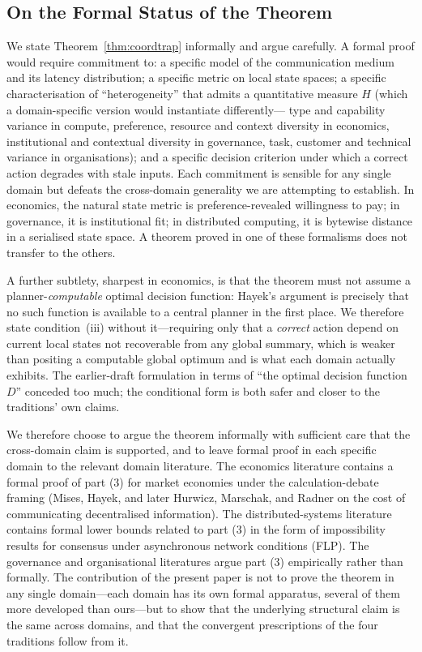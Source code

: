 \documentclass[11pt]{article}
\theoremstyle{definition}
\theoremstyle{plain}
\theoremstyle{plain}
\begin{document}
\subsection{On the Formal Status of the Theorem}
\label{sec:formalstatus}

We state Theorem~\ref{thm:coordtrap} informally and argue carefully. A formal
proof would require commitment to: a specific model of the communication
medium and its latency distribution; a specific metric on local state spaces;
a specific characterisation of ``heterogeneity'' that admits a quantitative
measure $H$ (which a domain-specific version would instantiate differently---
type and capability variance in compute, preference, resource and context
diversity in economics, institutional and contextual diversity in governance,
task, customer and technical variance in organisations); and a specific decision
criterion under which a correct action degrades with stale inputs. Each commitment is sensible for any
single domain but defeats the cross-domain generality we are attempting to
establish. In economics, the natural state metric is preference-revealed
willingness to pay; in governance, it is institutional fit; in distributed
computing, it is bytewise distance in a serialised state space. A theorem
proved in one of these formalisms does not transfer to the others.

A further subtlety, sharpest in economics, is that the theorem must not assume a
planner-\emph{computable} optimal decision function: Hayek's argument is precisely
that no such function is available to a central planner in the first place. We
therefore state condition~(iii) without it---requiring only that a \emph{correct}
action depend on current local states not recoverable from any global summary, which
is weaker than positing a computable global optimum and is what each domain actually
exhibits. The earlier-draft formulation in terms of ``the optimal decision function
$D$'' conceded too much; the conditional form is both safer and closer to the
traditions' own claims.

We therefore choose to argue the theorem informally with sufficient care that
the cross-domain claim is supported, and to leave formal proof in each
specific domain to the relevant domain literature. The economics literature
contains a formal proof of part (3) for market economies under the
calculation-debate framing (Mises, Hayek, and later Hurwicz, Marschak, and
Radner on the cost of communicating decentralised information). The
distributed-systems literature contains formal lower bounds related to
part (3) in the form of impossibility results for consensus under
asynchronous network conditions (FLP). The governance and organisational
literatures argue part (3) empirically rather than formally. The contribution
of the present paper is not to prove the theorem in any single domain---each
domain has its own formal apparatus, several of them more developed than
ours---but to show that the underlying structural claim is the same across
domains, and that the convergent prescriptions of the four traditions follow
from it.
\end{document}
